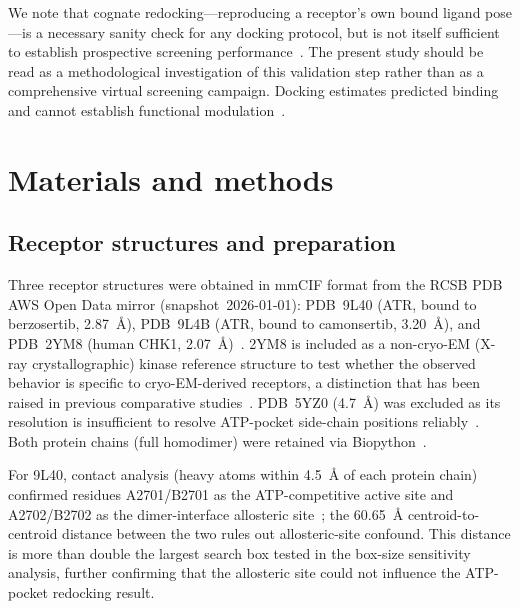 \documentclass[global,twocolumn]{svjour}
\begin{document}
We note that cognate redocking---reproducing a receptor's own bound ligand
pose---is a necessary sanity check for any docking protocol, but is not
itself sufficient to establish prospective screening
performance~\cite{jain2008,kruger2012,thygesen2022}. The present study should
be read as a methodological investigation of this validation step rather than
as a comprehensive virtual screening campaign. Docking estimates predicted
binding and cannot establish functional modulation~\cite{kumagai2006,bass2016}.

\section{Materials and methods}
\label{sec:methods}

\subsection{Receptor structures and preparation}

Three receptor structures were obtained in mmCIF format from the RCSB PDB AWS
Open Data mirror (snapshot~2026-01-01): PDB~9L40 (ATR, bound to berzosertib,
2.87~\AA{}), PDB~9L4B (ATR, bound to camonsertib, 3.20~\AA{}), and PDB~2YM8
(human CHK1, 2.07~\AA{})~\cite{wang2025}. 2YM8 is included as a non-cryo-EM
(X-ray crystallographic) kinase reference structure to test whether the
observed behavior is specific to cryo-EM-derived receptors, a distinction
that has been raised in previous comparative
studies~\cite{scanu2023,mcskimming2017}. PDB~5YZ0 (4.7~\AA{}) was excluded as
its resolution is insufficient to resolve ATP-pocket side-chain positions
reliably~\cite{wang2025}. Both protein chains (full homodimer) were retained
via Biopython~\cite{cock2009}.

For 9L40, contact analysis (heavy atoms within 4.5~\AA{} of each protein
chain) confirmed residues A2701/B2701 as the ATP-competitive active site and
A2702/B2702 as the dimer-interface allosteric site~\cite{wang2025}; the
60.65~\AA{} centroid-to-centroid distance between the two rules out
allosteric-site confound. This distance is more than double the largest
search box tested in the box-size sensitivity analysis, further confirming
that the allosteric site could not influence the ATP-pocket redocking result.
\end{document}
